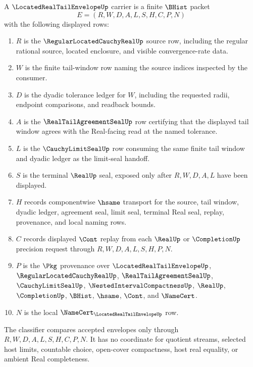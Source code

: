 \begin{definition}
\label{def:located-real-tail-envelope-carrier}
A $\LocatedRealTailEnvelopeUp$ carrier is a finite $\BHist$ packet
$$
E=(R,W,D,A,L,S,H,C,P,N)
$$
with the following displayed rows:
\begin{enumerate}
\item $R$ is the $\RegularLocatedCauchyRealUp$ source row, including the regular rational source, located enclosure, and visible convergence-rate data.
\item $W$ is the finite tail-window row naming the source indices inspected by the consumer.
\item $D$ is the dyadic tolerance ledger for $W$, including the requested radii, endpoint comparisons, and readback bounds.
\item $A$ is the $\RealTailAgreementSealUp$ row certifying that the displayed tail window agrees with the Real-facing read at the named tolerance.
\item $L$ is the $\CauchyLimitSealUp$ row consuming the same finite tail window and dyadic ledger as the limit-seal handoff.
\item $S$ is the terminal $\RealUp$ seal, exposed only after $R,W,D,A,L$ have been displayed.
\item $H$ records componentwise $\hsame$ transport for the source, tail window, dyadic ledger, agreement seal, limit seal, terminal Real seal, replay, provenance, and local naming rows.
\item $C$ records displayed $\Cont$ replay from each $\RealUp$ or $\CompletionUp$ precision request through $R,W,D,A,L,S,H,P,N$.
\item $P$ is the $\Pkg$ provenance over $\LocatedRealTailEnvelopeUp$, $\RegularLocatedCauchyRealUp$, $\RealTailAgreementSealUp$, $\CauchyLimitSealUp$, $\NestedIntervalCompactnessUp$, $\RealUp$, $\CompletionUp$, $\BHist$, $\hsame$, $\Cont$, and $\NameCert$.
\item $N$ is the local $\NameCert_{\LocatedRealTailEnvelopeUp}$ row.
\end{enumerate}
The classifier compares accepted envelopes only through $R,W,D,A,L,S,H,C,P,N$. It has no coordinate for quotient streams, selected host limits, countable choice, open-cover compactness, host real equality, or ambient Real completeness.
\end{definition}

